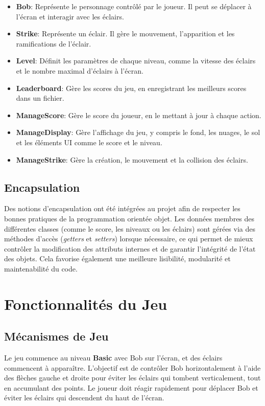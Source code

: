 \documentclass[a4paper,12pt]{article}
\begin{document}
	\begin{itemize}
		\item \textbf{Bob}: Représente le personnage contrôlé par le joueur. Il peut se déplacer à l'écran et interagir avec les éclairs.
		\item \textbf{Strike}: Représente un éclair. Il gère le mouvement, l'apparition et les ramifications de l'éclair.
		\item \textbf{Level}: Définit les paramètres de chaque niveau, comme la vitesse des éclairs et le nombre maximal d'éclairs à l'écran.
		\item \textbf{Leaderboard}: Gère les scores du jeu, en enregistrant les meilleurs scores dans un fichier.
		\item \textbf{ManageScore}: Gère le score du joueur, en le mettant à jour à chaque action.
		\item \textbf{ManageDisplay}: Gère l'affichage du jeu, y compris le fond, les nuages, le sol et les éléments UI comme le score et le niveau.
		\item \textbf{ManageStrike}: Gère la création, le mouvement et la collision des éclairs.
	\end{itemize}
	
	\subsection{Encapsulation}
	\noindent Des notions d'encapsulation ont été intégrées au projet afin de respecter les bonnes pratiques de la programmation orientée objet. Les données membres des différentes classes (comme le score, les niveaux ou les éclairs) sont gérées via des méthodes d'accès (\textit{getters} et \textit{setters}) lorsque nécessaire, ce qui permet de mieux contrôler la modification des attributs internes et de garantir l'intégrité de l'état des objets. Cela favorise également une meilleure lisibilité, modularité et maintenabilité du code.
	
	\newpage
	\section{Fonctionnalités du Jeu}
	
	\subsection{Mécanismes de Jeu}
	\noindent Le jeu commence au niveau \textbf{Basic} avec Bob sur l'écran, et des éclairs commencent à apparaître. L'objectif est de contrôler Bob horizontalement à l'aide des flèches gauche et droite pour éviter les éclairs qui tombent verticalement, tout en accumulant des points. Le joueur doit réagir rapidement pour déplacer Bob et éviter les éclairs qui descendent du haut de l'écran.
	
\end{document}
